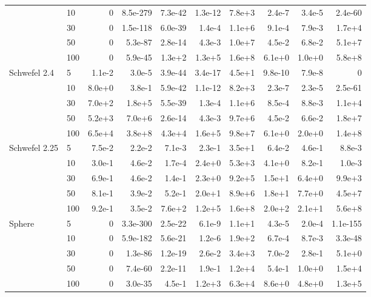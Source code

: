 {\begin{longtable}{llrrrrrrrr}
 & 10 & 0 & 8.5e{-}279 & 7.3e{-}42 & 1.3e{-}12 & 7.8e{+}3 & 2.4e{-}7 & 3.4e{-}5 & 2.4e{-}60 \\*
 & 30 & 0 & 1.5e{-}118 & 6.0e{-}39 & 1.4e{-}4 & 1.1e{+}6 & 9.1e{-}4 & 7.9e{-}3 & 1.7e{+}4 \\*
 & 50 & 0 & 5.3e{-}87 & 2.8e{-}14 & 4.3e{-}3 & 1.0e{+}7 & 4.5e{-}2 & 6.8e{-}2 & 5.1e{+}7 \\*
 & 100 & 0 & 5.9e{-}45 & 1.3e{+}2 & 1.3e{+}5 & 1.6e{+}8 & 6.1e{+}0 & 1.0e{+}0 & 5.8e{+}8 \\
\midrule
\multirow{5}{*}{Schwefel 2.4} & 5 & 1.1e{-}2 & 3.0e{-}5 & 3.9e{-}44 & 3.4e{-}17 & 4.5e{+}1 & 9.8e{-}10 & 7.9e{-}8 & 0 \\*
 & 10 & 8.0e{+}0 & 3.8e{-}1 & 5.9e{-}42 & 1.1e{-}12 & 8.2e{+}3 & 2.3e{-}7 & 2.3e{-}5 & 2.5e{-}61 \\*
 & 30 & 7.0e{+}2 & 1.8e{+}5 & 5.5e{-}39 & 1.3e{-}4 & 1.1e{+}6 & 8.5e{-}4 & 8.8e{-}3 & 1.1e{+}4 \\*
 & 50 & 5.2e{+}3 & 7.0e{+}6 & 2.6e{-}14 & 4.3e{-}3 & 9.7e{+}6 & 4.5e{-}2 & 6.6e{-}2 & 1.8e{+}7 \\*
 & 100 & 6.5e{+}4 & 3.8e{+}8 & 4.3e{+}4 & 1.6e{+}5 & 9.8e{+}7 & 6.1e{+}0 & 2.0e{+}0 & 1.4e{+}8 \\
\midrule
\multirow{5}{*}{Schwefel 2.25} & 5 & 7.5e{-}2 & 2.2e{-}2 & 7.1e{-}3 & 2.3e{-}1 & 3.5e{+}1 & 6.4e{-}2 & 4.6e{-}1 & 8.8e{-}3 \\*
 & 10 & 3.0e{-}1 & 4.6e{-}2 & 1.7e{-}4 & 2.4e{+}0 & 5.3e{+}3 & 4.1e{+}0 & 8.2e{-}1 & 1.0e{-}3 \\*
 & 30 & 6.9e{-}1 & 4.6e{-}2 & 1.4e{-}1 & 2.3e{+}0 & 9.2e{+}5 & 1.5e{+}1 & 6.4e{+}0 & 9.9e{+}3 \\*
 & 50 & 8.1e{-}1 & 3.9e{-}2 & 5.2e{-}1 & 2.0e{+}1 & 8.9e{+}6 & 1.8e{+}1 & 7.7e{+}0 & 4.5e{+}7 \\*
 & 100 & 9.2e{-}1 & 3.5e{-}2 & 7.6e{+}2 & 1.2e{+}5 & 1.6e{+}8 & 2.0e{+}2 & 2.1e{+}1 & 5.6e{+}8 \\
\midrule
\multirow{5}{*}{Sphere} & 5 & 0 & 3.3e{-}300 & 2.5e{-}22 & 6.1e{-}9 & 1.1e{+}1 & 4.3e{-}5 & 2.0e{-}4 & 1.1e{-}155 \\*
 & 10 & 0 & 5.9e{-}182 & 5.6e{-}21 & 1.2e{-}6 & 1.9e{+}2 & 6.7e{-}4 & 8.7e{-}3 & 3.3e{-}48 \\*
 & 30 & 0 & 1.3e{-}86 & 1.2e{-}19 & 2.6e{-}2 & 3.4e{+}3 & 7.0e{-}2 & 2.8e{-}1 & 5.1e{+}0 \\*
 & 50 & 0 & 7.4e{-}60 & 2.2e{-}11 & 1.9e{-}1 & 1.2e{+}4 & 5.4e{-}1 & 1.0e{+}0 & 1.5e{+}4 \\*
 & 100 & 0 & 3.0e{-}35 & 4.5e{-}1 & 1.2e{+}3 & 6.3e{+}4 & 8.6e{+}0 & 4.8e{+}0 & 1.3e{+}5 \\

\end{longtable}}
